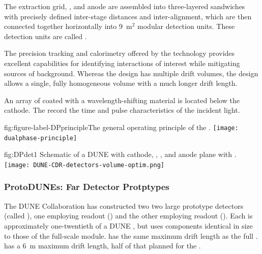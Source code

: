  The extraction grid, , and anode are assembled into three-layered sandwiches with precisely defined inter-stage distances and inter-alignment,  which are then connected together horizontally into \num{9}~m$^2$ modular detection units. These detection units are called .

The precision tracking and calorimetry offered by the  technology provides excellent capabilities for identifying interactions of interest while mitigating sources of background.  Whereas the  design has multiple drift volumes, the  design allows a single, fully homogeneous  volume with a much longer drift length.

An array of  coated with a wavelength-shifting material is located below the cathode. The  record  the time and pulse characteristics of the incident light.


\begin{dunefigure}{fig:figure-label-DPprinciple}{The general operating principle of the  .}
\texttt{[image: dualphase-principle]}
\end{dunefigure}

\begin{dunefigure}{fig:DPdet1}
  {Schematic of a \nominalmodsize DUNE    with cathode, , , and anode plane with .}
  \texttt{[image: DUNE-CDR-detectors-volume-optim.png]}
\end{dunefigure}
\FloatBarrier

\subsubsection{ProtoDUNEs: Far Detector Protptypes}

The DUNE Collaboration has constructed two 
two large prototype detectors (called ), one employing \single readout () and the other employing \dual readout (). Each is approximately one-twentieth of a DUNE , but uses components identical in size to those of the full-scale module.  has the same \spmaxdrift maximum drift length as the full .  has a \SI{6}{m} maximum drift length, half of that planned for the . 

